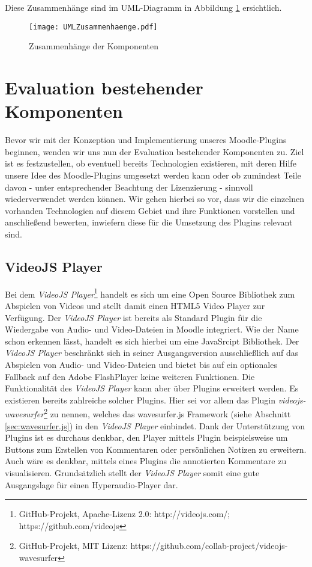 Diese Zusammenhänge sind im UML-Diagramm in Abbildung \ref{fig:UMLAufbau} ersichtlich.

\begin{figure}[h!]
\texttt{[image: UMLZusammenhaenge.pdf]}
\caption{\label{fig:UMLAufbau}Zusammenhänge der Komponenten}
\end{figure}


\section{Evaluation bestehender Komponenten}
Bevor wir mit der Konzeption und Implementierung unseres Moodle-Plugins beginnen, wenden wir uns nun der Evaluation bestehender Komponenten zu. Ziel ist es festzustellen, ob eventuell bereits Technologien existieren, mit deren Hilfe unsere Idee des Moodle-Plugins umgesetzt werden kann oder ob zumindest Teile davon - unter entsprechender Beachtung der Lizenzierung - sinnvoll wiederverwendet werden können. Wir gehen hierbei so vor, dass wir die einzelnen vorhanden Technologien auf diesem Gebiet und ihre Funktionen vorstellen und anschließend bewerten, inwiefern diese für die Umsetzung des Plugins relevant sind.

\subsection{VideoJS Player}
Bei dem \textit{VideoJS Player}\footnote{GitHub-Projekt, Apache-Lizenz 2.0: http://videojs.com/; https://github.com/videojs} handelt es sich um eine Open Source Bibliothek zum Abspielen von Videos und stellt damit einen HTML5 Video Player zur Verfügung. Der \textit{VideoJS Player} ist bereits als Standard Plugin für die Wiedergabe von Audio- und Video-Dateien in Moodle integriert. Wie der Name schon erkennen lässt, handelt es sich hierbei um eine JavaSrcipt Bibliothek. Der \textit{VideoJS Player} beschränkt sich in seiner Ausgangsversion ausschließlich auf das Abspielen von Audio- und Video-Dateien und bietet bis auf ein optionales Fallback auf den Adobe FlashPlayer keine weiteren Funktionen. Die Funktionalität des \textit{VideoJS Player} kann aber über Plugins erweitert werden. Es existieren bereits zahlreiche solcher Plugins. Hier sei vor allem das Plugin \textit{videojs-wavesurfer}\footnote{GitHub-Projekt, MIT Lizenz: https://github.com/collab-project/videojs-wavesurfer} zu nennen, welches das wavesurfer.js Framework (siehe Abschnitt \ref{sec:wavesurfer.js}) in den \textit{VideoJS Player} einbindet. Dank der Unterstützung von Plugins ist es durchaus denkbar, den Player mittels Plugin beispielsweise um Buttons zum Erstellen von Kommentaren oder persönlichen Notizen zu erweitern. Auch wäre es denkbar, mittels eines Plugins die annotierten Kommentare zu visualisieren. Grundsätzlich stellt der \textit{VideoJS Player} somit eine gute Ausgangslage für einen Hyperaudio-Player dar.

